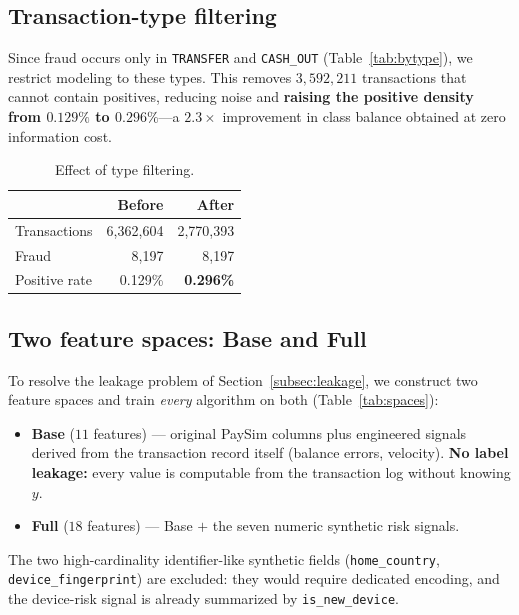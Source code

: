 \documentclass{article}
\begin{document}
\subsection{Transaction-type filtering}
\label{subsec:filter}
Since fraud occurs only in \texttt{TRANSFER} and \texttt{CASH\_OUT}
(Table~\ref{tab:bytype}), we restrict modeling to these types. This
removes $3{,}592{,}211$ transactions that cannot contain positives,
reducing noise and \textbf{raising the positive density from $0.129\%$
to $0.296\%$}---a $2.3\times$ improvement in class balance obtained at
zero information cost.

\begin{table}[H]
\centering
\caption{Effect of type filtering.}
\label{tab:filter}
\begin{tabular}{lrr}
\toprule
& Before & After \\
\midrule
Transactions & 6{,}362{,}604 & 2{,}770{,}393 \\
Fraud        & 8{,}197       & 8{,}197 \\
Positive rate & 0.129\%      & \textbf{0.296\%} \\
\bottomrule
\end{tabular}
\end{table}

\subsection{Two feature spaces: Base and Full}
\label{subsec:spaces}
To resolve the leakage problem of Section~\ref{subsec:leakage}, we
construct two feature spaces and train \emph{every} algorithm on both
(Table~\ref{tab:spaces}):

\begin{itemize}
    \item \textbf{Base} ($11$ features) --- original PaySim columns
    plus engineered signals derived from the transaction record itself
    (balance errors, velocity). \textbf{No label leakage:} every value
    is computable from the transaction log without knowing $y$.
    \item \textbf{Full} ($18$ features) --- Base $+$ the seven numeric
    synthetic risk signals.
\end{itemize}

The two high-cardinality identifier-like synthetic fields
(\texttt{home\_country}, \texttt{device\_fingerprint}) are excluded:
they would require dedicated encoding, and the device-risk signal is
already summarized by \texttt{is\_new\_device}.
\end{document}
